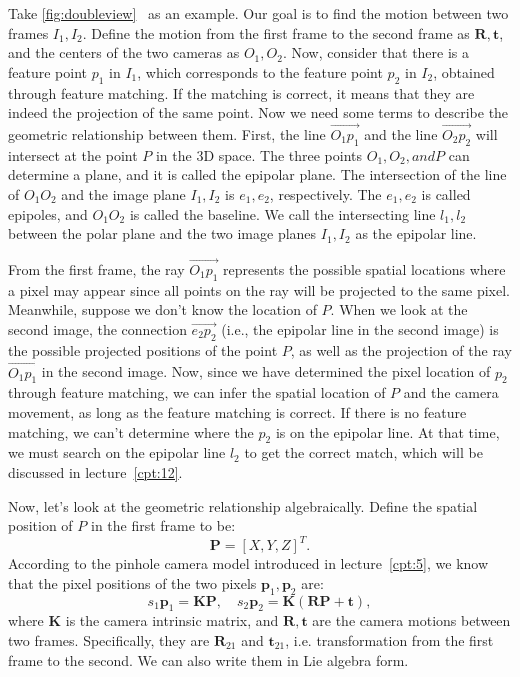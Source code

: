 Take \autoref{fig:doubleview}~ as an example. Our goal is to find the motion between two frames $I_{1}, I_{2}$. Define the motion from the first frame to the second frame as $\mathbf{R}, \mathbf{t}$, and the centers of the two cameras as $O_{1}, O_{2}$. Now, consider that there is a feature point $p_{1}$ in $I_{1}$, which corresponds to the feature point $p_{2}$ in $I_{2}$, obtained through feature matching. If the matching is correct, it means that they are indeed the projection of the same point. Now we need some terms to describe the geometric relationship between them. First, the line $\overrightarrow{O_{1}p_{1}}$ and the line $\overrightarrow{O_{2}p_{2}}$ will intersect at the point $P$ in the 3D space. The three points $O_{1}, O_{2}, and P$ can determine a plane, and it is called the epipolar plane. The intersection of the line of $O_{1}O_{2}$ and the image plane $I_{1}, I_{2}$ is $e_{1}, e_{2}$, respectively. The $e_{1}, e_{2}$ is called epipoles, and $O_{1}O_{2}$ is called the baseline. We call the intersecting line $l_{1},l_{2}$ between the polar plane and the two image planes $I_{1}, I_{2}$ as the epipolar line.

From the first frame, the ray $\overrightarrow{O_1 p_1}$ represents the possible spatial locations where a pixel may appear since all points on the ray will be projected to the same pixel. Meanwhile, suppose we don't know the location of $P$. When we look at the second image, the connection $\overrightarrow{e_2 p_2}$ (i.e., the epipolar line in the second image) is the possible projected positions of the point $P$, as well as the projection of the ray $\overrightarrow{O_1 p_1}$ in the second image. Now, since we have determined the pixel location of $p_2$ through feature matching, we can infer the spatial location of $P$ and the camera movement, as long as the feature matching is correct. If there is no feature matching, we can't determine where the $p_2$ is on the epipolar line. At that time, we must search on the epipolar line $l_2$ to get the correct match, which will be discussed in lecture~\ref{cpt:12}.

Now, let's look at the geometric relationship algebraically. Define the spatial position of $P$ in the first frame to be:
\[
\mathbf{P}=[X,Y,Z]^T.
\]
According to the pinhole camera model introduced in lecture~\ref{cpt:5}, we know that the pixel positions of the two pixels $\mathbf{p}_1,\mathbf{p}_2$ are:
\begin{equation}
\label{eq:7.1}
s_1 {\mathbf{p}_1} = \mathbf{KP},\quad s_2 \mathbf{p}_2 = \mathbf{K}\left( \mathbf{RP + t} \right),
\end{equation}
where $\mathbf{K}$ is the camera intrinsic  matrix, and $\mathbf{R}, \mathbf{t}$ are the camera motions between two frames. Specifically, they are $\mathbf{R}_{21}$ and $\mathbf{t}_{21}$, i.e. transformation from the first frame to the second. We can also write them in Lie algebra form.

